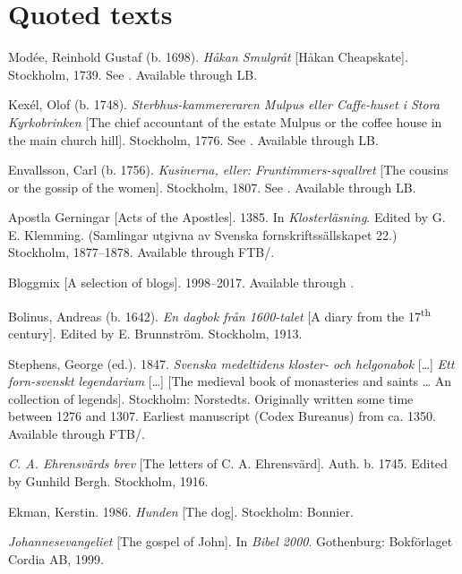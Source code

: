 \documentclass[output=paper]{langscibook}
\begin{document}
\section*{Quoted texts}
\begin{description}[font=\normalfont]\sloppy
\item[1dSMUL:] Modée, Reinhold Gustaf (b. 1698). \textit{Håkan Smulgråt} [Håkan Cheapskate]. Stockholm, 1739. See  \citet{MarttalaStromquist2001}. Available through LB.
\item[2aSTERBH:] Kexél, Olof (b. 1748). \textit{Sterbhus-kammereraren Mulpus eller Caffe-huset i Stora Kyrkobrinken} [The chief accountant of the estate Mulpus or the coffee house in the main church hill]. Stockholm, 1776. See \citet{MarttalaStromquist2001}. Available through LB.
\item[2cKUSINE:] Envallsson, Carl (b. 1756). \textit{Kusinerna, eller: Fruntimmers-sqvallret} [The cousins or the gossip of the women]. Stockholm, 1807. See \citet{MarttalaStromquist2001}. Available through LB.
\item[ApG:] Apostla Gerningar [Acts of the Apostles]. 1385. In \textit{Klosterläsning}. Edited by G. E. Klemming. (Samlingar utgivna av Svenska fornskriftssällskapet 22.) Stockholm, 1877–1878. Available through FTB\slash {}.
\item[Blogg:] Bloggmix [A selection of  blogs]. 1998–2017. Available through .
\item[Bol:] Bolinus, Andreas (b. 1642). \textit{En dagbok från 1600-talet} [A diary from the 17\textsuperscript{th} century]. Edited by E. Brunnström. Stockholm, 1913. 
\item[Leg:] Stephens, George (ed.). 1847. \textit{Svenska medeltidens kloster- och helgonabok} […] \textit{Ett forn-svenskt legendarium} […] [The  medieval book of monasteries and saints … An  collection of legends]. Stockholm: Norstedts. Originally written some time between 1276 and 1307. Earliest manuscript (Codex Bureanus) from ca. 1350. Available through FTB\slash {}.
\item[Ehrensvärd:] \textit{C. A. Ehrensvärds brev} [The letters of C. A. Ehrensvärd]. Auth. b. 1745. Edited by Gunhild Bergh. Stockholm, 1916.
\item[Hunden:] Ekman, Kerstin. 1986. \textit{Hunden} [The dog]. Stockholm: Bonnier. 
\item[Joh.:] \textit{Johannesevangeliet} [The gospel of John]. In \textit{Bibel 2000}. Gothenburg: Bokförlaget Cordia AB, 1999. 

\end{description}
\end{document}
